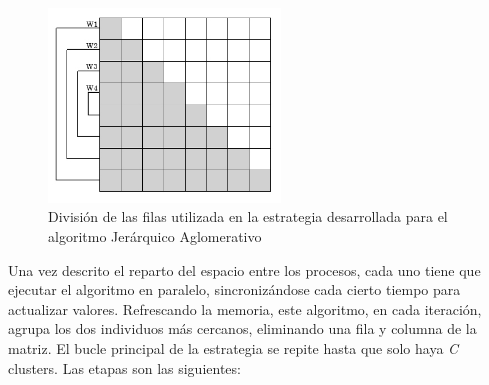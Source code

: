 		\begin{figure}[!h]
			\centering
			\includegraphics[width=0.55\textwidth]{images/chapter_3/aglomerativo_mpi}
			
			
			\caption{División de las filas utilizada en la estrategia desarrollada para el algoritmo Jerárquico Aglomerativo}
			\label{fig:aglomerativo}
		\end{figure}
		
		
		
		Una vez descrito el reparto del espacio entre los procesos, cada uno tiene que ejecutar el algoritmo en paralelo, sincronizándose cada cierto tiempo para actualizar valores. Refrescando la memoria, este algoritmo, en cada iteración, agrupa los dos individuos más cercanos, eliminando una fila y columna de la matriz. El bucle principal de la estrategia se repite hasta que solo haya \textit{C} clusters. Las etapas son las siguientes:
		
